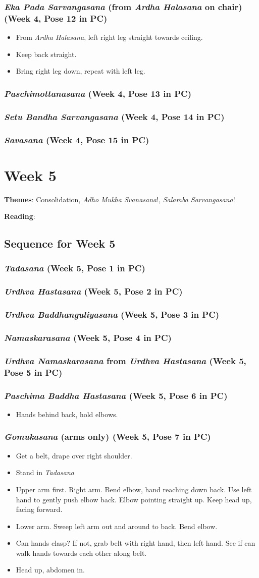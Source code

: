 \documentclass{book}
\newcommand{\apose}[1]{\emph{#1}}
\newcommand{\ams}{\apose{Adho Mukha Svanasana}}
\newcommand{\ardhal}{\apose{Ardha Halasana}}
\newcommand{\ekapadsarv}{\apose{Eka Pada Sarvangasana}}
\newcommand{\gomu}{\apose{Gomukasana}}
\newcommand{\nam}{\apose{Namaskarasana}}
\newcommand{\paschi}{\apose{Paschimottanasana}}
\newcommand{\paschbadhast}{\apose{Paschima Baddha Hastasana}}
\newcommand{\sarv}{\apose{Salamba Sarvangasana}}
\newcommand{\sav}{\apose{Savasana}}
\newcommand{\setubandsarv}{\apose{Setu Bandha Sarvangasana}}
\newcommand{\tad}{\apose{Tadasana}}
\newcommand{\urdbad}{\apose{Urdhva Baddhanguliyasana}}
\newcommand{\urdhast}{\apose{Urdhva Hastasana}}
\newcommand{\urdnam}{\apose{Urdhva Namaskarasana}}
\newcommand{\PC}[2]{{\normalfont \hfill(Week #1, Pose #2 in PC)}}
\newcommand{\newpose}[1]{{{#1}}}
\newcounter{week}
\newcounter{pose}
\newcommand{\week}[1]
{ \IfDecimal{#1}{\setcounter{week}{\integerpart}}{fooey}
  \setcounter{pose}{1}
  \chapter{Week {#1}}}
\newcommand{\pose}{\subsection}
\begin{document}
\pose{ \newpose{\ekapadsarv{}} (from \ardhal{} on chair) \PC{4}{12}}

  \begin{itemize}
  \item From \ardhal{}, left right leg straight towards ceiling.
  \item Keep back straight.
  \item Bring right leg down, repeat with left leg.
  \end{itemize}

\pose{ \paschi{} \PC{4}{13}}

\pose{ \setubandsarv{} \PC{4}{14}}

\pose{ \sav{} \PC{4}{15}}


\week{5}
\label{week:5}

\textbf{Themes}: Consolidation, \ams{}!, \sarv{}!

\textbf{Reading}: 

\section{Sequence for Week 5}
\label{seq:5}

\pose{ \tad{} \PC{5}{1}}

\pose{ \urdhast{} \PC{5}{2}}

\pose{ \urdbad{}  \PC{5}{3}}

\pose{ \nam{}  \PC{5}{4}}

\pose{ \urdnam{} from \urdhast{}  \PC{5}{5}}

\pose{ \newpose{\paschbadhast{}}  \PC{5}{6}}

  \begin{itemize}
  \item Hands behind back, hold elbows.
  \end{itemize}

\pose{ \newpose{\gomu{}} (arms only) \PC{5}{7}}

  \begin{itemize}
  \item Get a belt, drape over right shoulder.
  \item Stand in \tad{}
  \item Upper arm first. Right arm. Bend elbow, hand reaching down
    back. Use left hand to gently push elbow back. Elbow pointing
    straight up. Keep head up, facing forward.
  \item Lower arm. Sweep left arm out and around to back. Bend elbow.  
  \item Can hands clasp? If not, grab belt with right hand, then left
    hand. See if can walk hands towards each other along belt.
  \item Head up, abdomen in.
  \end{itemize}
\end{document}
